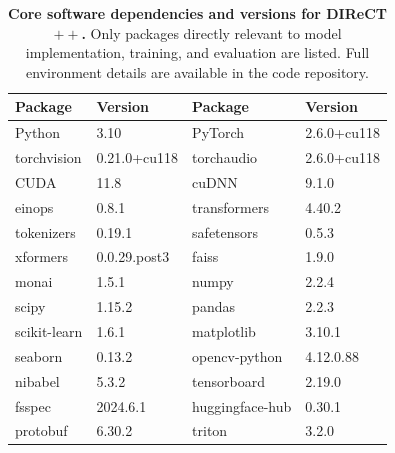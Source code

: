 \begin{table}[htbp]
\caption{\textbf{Core software dependencies and versions for DIReCT$++$.} Only packages directly relevant to model implementation, training, and evaluation are listed. Full environment details are available in the code repository.}
\label{tab:supp_software}
\centering
\begin{tabularx}{\textwidth}{lX lX}
\toprule
\textbf{Package} & \textbf{Version} & \textbf{Package} & \textbf{Version} \\
\midrule
Python & 3.10 & PyTorch & 2.6.0+cu118 \\
torchvision & 0.21.0+cu118 & torchaudio & 2.6.0+cu118 \\
CUDA & 11.8 & cuDNN & 9.1.0 \\
einops & 0.8.1 & transformers & 4.40.2 \\
tokenizers & 0.19.1 & safetensors & 0.5.3 \\
xformers & 0.0.29.post3 & faiss & 1.9.0 \\
monai & 1.5.1 & numpy & 2.2.4 \\
scipy & 1.15.2 & pandas & 2.2.3 \\
scikit-learn & 1.6.1 & matplotlib & 3.10.1 \\
seaborn & 0.13.2 & opencv-python & 4.12.0.88 \\
nibabel & 5.3.2 & tensorboard & 2.19.0 \\
fsspec & 2024.6.1 & huggingface-hub & 0.30.1 \\
protobuf & 6.30.2 & triton & 3.2.0 \\
\bottomrule
\end{tabularx}
\end{table}


